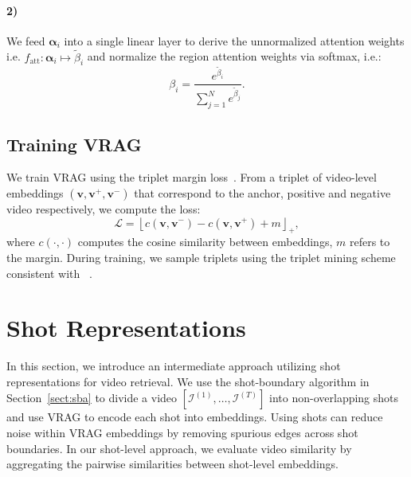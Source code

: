 \documentclass[letterpaper]{article} \usepackage{aaai22}  \usepackage{times}  \usepackage{helvet}  \usepackage{courier}  \usepackage[hyphens]{url}  \usepackage{graphicx} \urlstyle{rm} \usepackage{amsmath}
\begin{document}
\vspace{-2mm}
\paragraph{2)} We feed $\boldsymbol{\alpha}_i$ into a single linear layer to derive the unnormalized attention weights i.e. $f_\text{att}: \boldsymbol{\alpha}_i \mapsto \tilde{\beta}_i$ and normalize the region attention weights 
via softmax, i.e.:
\begin{equation}
   \beta_i = \frac{e^{\tilde\beta_i}}{\sum^{N}_{j=1}e^{\tilde\beta_j}}.
\end{equation}

\subsection{Training VRAG}
We train VRAG using the triplet margin loss~\cite{triplet-margin-loss}. From a triplet of video-level embeddings $\left(\mathbf{v}, \mathbf{v}^+, \mathbf{v}^-\right)$ that correspond to the anchor, positive and negative video respectively, we compute the loss:
\begin{equation}
    \mathcal{L} = \left\lfloor c\left(\mathbf{v}, \mathbf{v}^-\right) - c\left(\mathbf{v}, \mathbf{v}^{+}\right) + m\right\rfloor_+,
\end{equation}
where $c(\cdot, \cdot)$ computes the cosine similarity between embeddings, $m$ refers to the margin. During training, we sample triplets using the triplet mining scheme consistent with ~\cite{kordopatiszilos2019visil}.

\section{Shot Representations}

In this section, we introduce an intermediate approach utilizing shot representations for video retrieval. We use the shot-boundary algorithm in Section~\ref{sect:sba} to divide a video $\left[\mathcal{I}^{(1)}, \ldots, \mathcal{I}^{(T)}\right]$ into non-overlapping shots and use VRAG to encode each shot into embeddings. Using shots can reduce noise within VRAG embeddings by removing spurious edges across shot boundaries.
In our shot-level approach, we evaluate video similarity by aggregating the pairwise similarities between shot-level embeddings.
\end{document}
